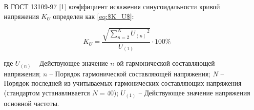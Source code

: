 

В ГОСТ 13109-97 [1] коэффициент искажения синусоидальности кривой напряжения $K_U$ определен как \eqref{eq:$K_U$}:

\begin{equation}
\label{eq:$K_U$}
K_U = \frac{\sqrt{\sum_{n=2}^N {U_{(n)}}^2}}{U_{(1)}}\cdot 100 \%
\end{equation}

где $U_{(n)}$ -- Действующее значение $n$-ой гармонической составляющей напряжения;
$n$ -- Порядок гармонической составляющей напряжения;
$N$ -- Порядок последней из учитываемых гармонических составляющих напряжения (стандартом устанавливается $N=40$);
$U_{(1)}$ -- Действующее значение напряжения основной частоты.









